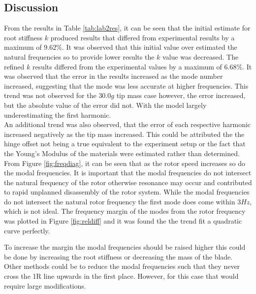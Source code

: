 \documentclass[11pt]{article}
\begin{document}
\subsection{Discussion}
From the results in Table \ref{tab:lab2res}, it can be seen that the initial estimate for root stiffness $k$ produced results that differed from experimental results by a maximum of $9.62\%$. It was observed that this initial value over estimated the natural frequencies so to provide lower results the $k$ value was decreased. The refined $k$ results differed from the experimental values by a maximum of $6.68\%$. It was observed that the error in the results increased as the mode number increased, suggesting that the mode was less accurate at higher frequencies. This trend was not observed for the $30.0g$ tip mass case however, the error increased, but the absolute value of the error did not. With the model largely underestimating the first harmonic.\\ An additional trend was also observed, that the error of each respective harmonic increased negatively as the tip mass increased. This could be attributed the the hinge offset not being a true equivalent to the experiment setup or the fact that the Young's Modulus of the materials were estimated rather than determined.\\

From Figure \ref{fig:freqdiag}, it can be seen that as the rotor speed increases so do the modal frequencies. It is important that the modal frequencies do not intersect the natural frequency of the rotor otherwise resonance may occur and contributed to rapid unplanned disassembly of the rotor system. While the modal frequencies do not intersect the natural rotor frequency the first mode does come within $3Hz$, which is not ideal. The frequency margin of the modes from the rotor frequency was plotted in Figure \ref{fig:reldiff} and it was found the the trend fit a quadratic curve perfectly. 

To increase the margin the modal frequencies should be raised higher this could be done by increasing the root stiffness or decreasing the mass of the blade. Other methods could be to reduce the modal frequencies such that they never cross the 1R line upwards in the first place. However, for this case that would require large modifications.
\end{document}
